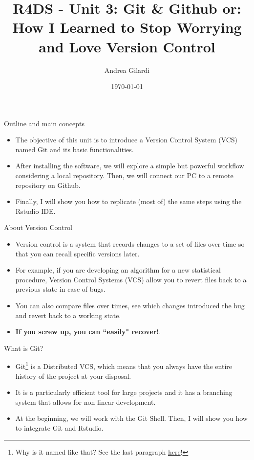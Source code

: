\documentclass[
hyperref={bookmarks=false},
xcolor={dvipsnames,svgnames*,x11names*}, 
12pt
]{beamer}
\title{R4DS - Unit 3: Git \& Github or: How I Learned to Stop Worrying and Love Version Control\vspace{-1.25cm}}
\author{Andrea Gilardi}
\date{\today}
\begin{document}
\inserttitlepage

\begin{frame}{Outline and main concepts}
\vspace{-0.5cm}
\begin{itemize}
	\itemsep 3ex
	\item The objective of this unit is to introduce a Version Control System (VCS) named Git and its basic functionalities. 
	\item After installing the software, we will explore a simple but powerful workflow considering a local repository. Then, we will connect our PC to a remote repository on Github. 
	\item Finally, I will show you how to replicate (most of) the same steps using the Rstudio IDE. 
\end{itemize}
\end{frame}

\begin{frame}{About Version Control}
\vspace{-0.5cm}
\begin{itemize}
\itemsep 3ex
\item Version control is a system that records changes to a set of files over time so that you can recall specific versions later.
\item For example, if you are developing an algorithm for a new statistical procedure, Version Control Systems (VCS) allow you to revert files back to a previous state in case of bugs. 
\item You can also compare files over times, see which changes introduced the bug and revert back to a working state. 
\item \textbf{If you screw up, you can ``easily" recover!}. 
\end{itemize}
\end{frame}

\begin{frame}{What is Git?}
\vspace{-0.5cm}
\begin{itemize}
	\itemsep 3ex
	\item Git\footnote{Why is it named like that? See the last paragraph \href{https://github.com/git/git\#readme}{here}!} is a Distributed VCS, which means that you always have the entire history of the project at your disposal.
	\item It is a particularly efficient tool for large projects and it has a branching system that allows for non-linear development. 
	
	\item At the beginning, we will work with the Git Shell. Then, I will show you how to integrate Git and Rstudio. 
\end{itemize}
\end{frame}
\end{document}

